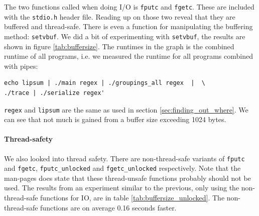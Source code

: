 The two functions called when doing I/O is \lstinline{fputc} and
\lstinline{fgetc}. These are included with the \texttt{stdio.h} header
file. Reading up on those two reveal that they are buffered and
thread-safe. There is even a function for manipulating the buffering
method: \lstinline{setvbuf}. We did a bit of experimenting with
\lstinline{setvbuf}, the results are shown in figure
\vref{tab:buffersize}. The runtimes in the graph is the combined
runtime of all programs, i.e. we measured the runtime for all programs
combined with pipes:
\begin{verbatim}
echo lipsum | ./main regex | ./groupings_all regex  |  \
./trace | ./serialize regex'
\end{verbatim}
\texttt{regex} and \texttt{lipsum} are the same as used in section
\vref{sec:finding_out_where}. We can see that not much is gained from
a buffer size exceeding 1024 bytes.

\paragraph{Thread-safety}
We also looked into thread safety. There are non-thread-safe variants
of \lstinline{fputc} and \lstinline{fgetc}, \lstinline{fputc_unlocked}
and \lstinline{fgetc_unlocked} respectively. Note that the man-pages
does state that these thread-unsafe functions probably should not be
used. The results from an experiment similar to the previous, only
using the non-thread-safe functions for IO, are in table
\vref{tab:buffersize_unlocked}. The non-thread-safe functions are on
average 0.16 seconds faster.





